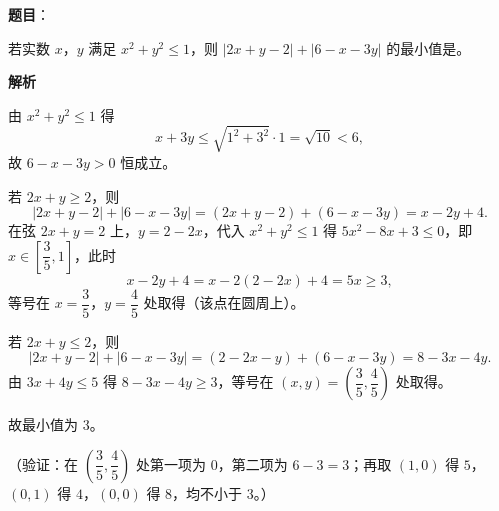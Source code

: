 \begin{answer}

\textbf{题目}：

若实数 \(x\)，\(y\) 满足 \(x^2+y^2\leqslant1\)，则 \(|2x+y-2|+|6-x-3y|\) 的最小值是\gkblank{}。

\textbf{解析}

由 \(x^2+y^2\leqslant1\) 得
\nopagebreak[4]
\[
x+3y\leqslant\sqrt{1^2+3^2}\cdot1=\sqrt{10}<6,
\]
故 \(6-x-3y>0\) 恒成立。

若 \(2x+y\geqslant2\)，则
\nopagebreak[4]
\[
|2x+y-2|+|6-x-3y|=(2x+y-2)+(6-x-3y)=x-2y+4.
\]
在弦 \(2x+y=2\) 上，\(y=2-2x\)，代入 \(x^2+y^2\leqslant1\) 得 \(5x^2-8x+3\leqslant0\)，即 \(x\in\left[\dfrac35,1\right]\)，此时
\nopagebreak[4]
\[
x-2y+4=x-2(2-2x)+4=5x\geqslant3,
\]
等号在 \(x=\dfrac35\)，\(y=\dfrac45\) 处取得（该点在圆周上）。

若 \(2x+y\leqslant2\)，则
\nopagebreak[4]
\[
|2x+y-2|+|6-x-3y|=(2-2x-y)+(6-x-3y)=8-3x-4y.
\]
由 \(3x+4y\leqslant5\) 得 \(8-3x-4y\geqslant3\)，等号在 \((x,y)=\left(\dfrac35,\dfrac45\right)\) 处取得。

故最小值为 \(3\)。

（验证：在 \(\left(\dfrac35,\dfrac45\right)\) 处第一项为 \(0\)，第二项为 \(6-3=3\)；再取 \((1,0)\) 得 \(5\)，\((0,1)\) 得 \(4\)，\((0,0)\) 得 \(8\)，均不小于 \(3\)。）


\end{answer}
